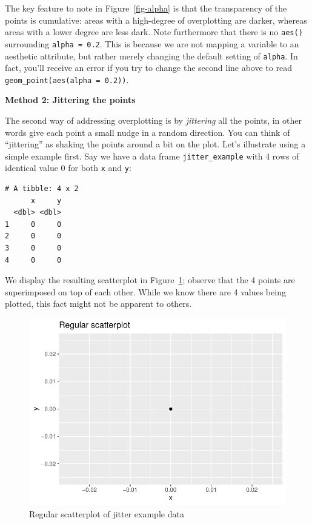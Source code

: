 \documentclass[
  letterpaper,
  DIV=11,
  numbers=noendperiod]{scrreprt}
\theoremstyle{definition}
\theoremstyle{remark}
\begin{document}
The key feature to note in Figure~\ref{fig-alpha} is that the
transparency of the points is cumulative: areas with a high-degree of
overplotting are darker, whereas areas with a lower degree are less
dark. Note furthermore that there is no \texttt{aes()} surrounding
\texttt{alpha\ =\ 0.2}. This is because we are not mapping a variable to
an aesthetic attribute, but rather merely changing the default setting
of \texttt{alpha}. In fact, you'll receive an error if you try to change
the second line above to read \texttt{geom\_point(aes(alpha\ =\ 0.2))}.

\textbf{Method 2: Jittering the points}

The second way of addressing overplotting is by \emph{jittering} all the
points, in other words give each point a small nudge in a random
direction. You can think of ``jittering'' as shaking the points around a
bit on the plot. Let's illustrate using a simple example first. Say we
have a data frame \texttt{jitter\_example} with 4 rows of identical
value 0 for both \texttt{x} and \texttt{y}:

\begin{verbatim}
# A tibble: 4 x 2
      x     y
  <dbl> <dbl>
1     0     0
2     0     0
3     0     0
4     0     0
\end{verbatim}

We display the resulting scatterplot in
Figure~\ref{fig-jitter-example-plot-1}; observe that the 4 points are
superimposed on top of each other. While we know there are 4 values
being plotted, this fact might not be apparent to others.

\begin{figure}

{\centering \includegraphics{02-visualization_files/figure-pdf/fig-jitter-example-plot-1-1.pdf}

}

\caption{\label{fig-jitter-example-plot-1}Regular scatterplot of jitter
example data}

\end{figure}
\end{document}

